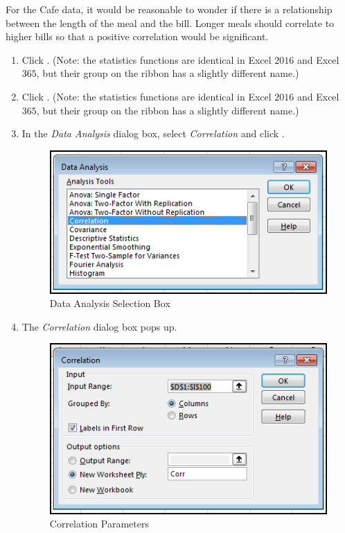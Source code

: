 For the Cafe data, it would be reasonable to wonder if there is a relationship between the length of the meal and the bill. Longer meals should correlate to higher bills so that a positive correlation would be significant.

\begin{enumbox}
	\begin{enumerate}
		\item {} Click . (Note: the statistics functions are identical in Excel $ 2016 $ and Excel $ 365 $, but their group on the ribbon has a slightly different name.)
		\item {} Click . (Note: the statistics functions are identical in Excel $ 2016 $ and Excel $ 365 $, but their group on the ribbon has a slightly different name.)
		\item In the \textit{Data Analysis} dialog box, select \textit{Correlation} and click .

		\begin{figure}[H]
			\centering
			\includegraphics[width=\maxwidth{.95\linewidth}]{gfx/ch09_fig54}
			\caption{Data Analysis Selection Box}
			\label{09:fig54}
		\end{figure}

		\item The \textit{Correlation} dialog box pops up.

		\begin{figure}[H]
			\centering
			\includegraphics[width=\maxwidth{.75\linewidth}]{gfx/ch09_fig55}
			\caption{Correlation Parameters}
			\label{09:fig55}
		\end{figure}


\end{enumerate}
\end{enumbox}
